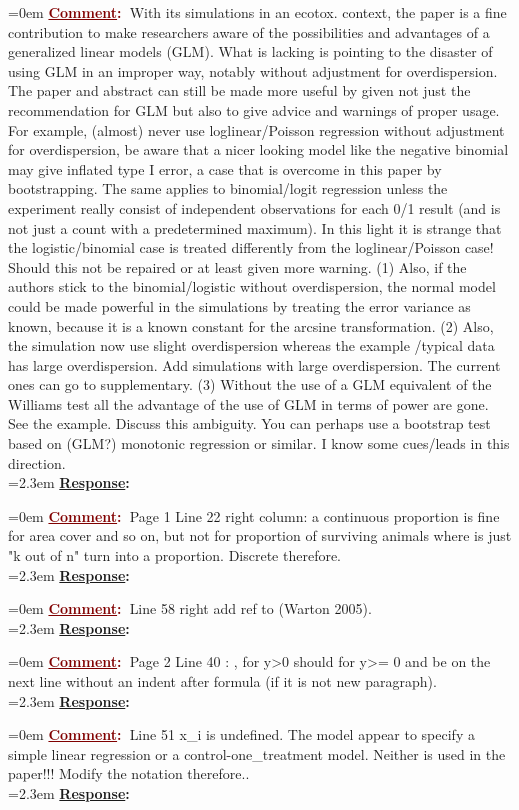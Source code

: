 \documentclass[12pt]{article}
\newcommand{\comment}[0]{\vspace{1em} \noindent \hangindent=0em \textbf{\textcolor{Maroon}{\uline{Comment}:~}}}
\newcommand{\response}[0]{\\\vspace{0.1em} \hangindent=2.3em \textbf{\textcolor{NavyBlue}{\uline{Response}:~}}}
\begin{document}
\comment With its simulations in an ecotox. context, the paper is a fine contribution to make researchers aware of the possibilities and advantages of a generalized linear models (GLM). What is lacking is pointing to the disaster of using GLM in an improper way, notably without adjustment for overdispersion. The paper and abstract can still be made more useful by given not just the recommendation for GLM but also to give advice and warnings of proper usage. For example, (almost) never use loglinear/Poisson regression without adjustment for overdispersion, be aware that a nicer looking model like the negative binomial may give inflated type I error, a case that is overcome in this paper by bootstrapping. The same applies to binomial/logit regression unless the experiment really consist of independent observations for each 0/1 result (and is not just a count with a predetermined maximum). In this light it is strange that the logistic/binomial case is treated differently from
the loglinear/Poisson case! Should this not be repaired or at least given more warning. 
(1) Also, if the authors stick to the binomial/logistic without overdispersion, the normal model could be made powerful in the simulations by treating the error variance as known, because it is a known constant for the arcsine transformation. 
(2) Also, the simulation now use slight overdispersion whereas the example /typical data has large overdispersion. Add simulations with large overdispersion. The current ones can go to supplementary.
(3) Without the use of a GLM equivalent of the Williams test all the advantage of the use of GLM in terms of power are gone.  See the example. Discuss this ambiguity. You can perhaps use a bootstrap test based on (GLM?) monotonic regression or similar. I know some cues/leads in this direction.
\response

\comment Page 1 Line 22 right column: a continuous proportion is fine for area cover and so on, but not for proportion of surviving animals where is just "k out of n" turn into a proportion. Discrete therefore. 
\response

\comment Line 58 right add ref to (Warton 2005). 
\response

\comment Page 2 Line 40 : , for y>0 should for y>= 0 and  be on the next line without an indent after formula (if it is not new paragraph).
\response

\comment Line 51 x\_i is undefined. The model appear to specify a simple linear regression or a control-one\_treatment model. Neither is used in the paper!!! Modify the notation therefore..
\response
\end{document}
